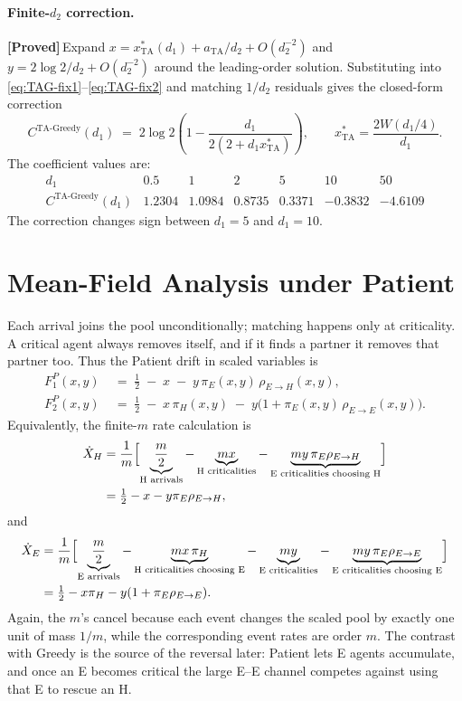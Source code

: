 \documentclass{article}
\theoremstyle{plain}
\theoremstyle{definition}
\newcommand{\proved}{\textcolor{provedgreen}{\textbf{[Proved]}}\,}
\begin{document}
\paragraph{Finite-$d_2$ correction.}
\proved Expand $x=x^\ast_{\mathrm{TA}}(d_1)+a_{\mathrm{TA}}/d_2+O(d_2^{-2})$ and $y=2\log 2/d_2+O(d_2^{-2})$ around the leading-order solution. Substituting into \eqref{eq:TAG-fix1}--\eqref{eq:TAG-fix2} and matching $1/d_2$ residuals gives the closed-form correction
\[
C^{\text{TA-Greedy}}(d_1)
\;=\;
2\log 2\left(1-\frac{d_1}{2(2+d_1x^\ast_{\mathrm{TA}})}\right),
\qquad
x^\ast_{\mathrm{TA}}=\frac{2W(d_1/4)}{d_1}.
\]
The coefficient values are:
\[
\begin{array}{r|rrrrrr}
d_1 & 0.5 & 1 & 2 & 5 & 10 & 50\\\hline
C^{\text{TA-Greedy}}(d_1) & 1.2304 & 1.0984 & 0.8735 & 0.3371 & -0.3832 & -4.6109
\end{array}
\]
The correction changes sign between $d_1=5$ and $d_1=10$.


\section{Mean-Field Analysis under Patient}
\label{sec:patient}

Each arrival joins the pool unconditionally; matching happens only at criticality. A critical agent always removes itself, and if it finds a partner it removes that partner too. Thus the Patient drift in scaled variables is
\begin{align}
F_1^P(x,y) &\;=\;\tfrac12\;-\;x\;-\;y\,\pi_E(x,y)\,\rho_{E\to H}(x,y),\label{eq:F1P}\\
F_2^P(x,y) &\;=\;\tfrac12\;-\;x\,\pi_H(x,y)\;-\;y\bigl(1+\pi_E(x,y)\,\rho_{E\to E}(x,y)\bigr).\label{eq:F2P}
\end{align}
Equivalently, the finite-$m$ rate calculation is
\[
\begin{aligned}
\dot X_H
&=\frac{1}{m}\Bigl[
\underbrace{\frac m2}_{\text{H arrivals}}
-\underbrace{mx}_{\text{H criticalities}}
-\underbrace{my\,\pi_E\rho_{E\to H}}_{\text{E criticalities choosing H}}
\Bigr]\\
&=\tfrac12-x-y\pi_E\rho_{E\to H},
\end{aligned}
\]
and
\[
\begin{aligned}
\dot X_E
&=\frac{1}{m}\Bigl[
\underbrace{\frac m2}_{\text{E arrivals}}
-\underbrace{mx\,\pi_H}_{\text{H criticalities choosing E}}
-\underbrace{my}_{\text{E criticalities}}
-\underbrace{my\,\pi_E\rho_{E\to E}}_{\text{E criticalities choosing E}}
\Bigr]\\
&=\tfrac12-x\pi_H-y(1+\pi_E\rho_{E\to E}).
\end{aligned}
\]
Again, the $m$'s cancel because each event changes the scaled pool by exactly one unit of mass $1/m$, while the corresponding event rates are order $m$.
The contrast with Greedy is the source of the reversal later: Patient lets E agents accumulate, and once an E becomes critical the large E--E channel competes against using that E to rescue an H.
\end{document}
